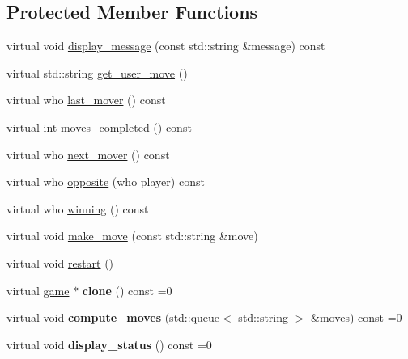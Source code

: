 \subsection*{Protected Member Functions}
\begin{DoxyCompactItemize}
\item 
virtual void \hyperlink{classmain__savitch__14_1_1game_ab8b87c3a1b68634861a8c0ed2b9f1992}{display\+\_\+message} (const std\+::string \&message) const 
\item 
virtual std\+::string \hyperlink{classmain__savitch__14_1_1game_af389f976b7a6c75e096990a09fac94ba}{get\+\_\+user\+\_\+move} ()
\item 
virtual who \hyperlink{classmain__savitch__14_1_1game_a38d435da6aadc192ac10160b26ea0cc1}{last\+\_\+mover} () const 
\item 
virtual int \hyperlink{classmain__savitch__14_1_1game_aee677d1ef52c35474cb7c6071bb71749}{moves\+\_\+completed} () const 
\item 
virtual who \hyperlink{classmain__savitch__14_1_1game_a0d445fdec3201c91c145ee2763e08922}{next\+\_\+mover} () const 
\item 
virtual who \hyperlink{classmain__savitch__14_1_1game_ae38d001e92ebe46e1a1433e41446c7ab}{opposite} (who player) const 
\item 
virtual who \hyperlink{classmain__savitch__14_1_1game_a081611c42aa66b4d91bbefeec47c7c4e}{winning} () const 
\item 
virtual void \hyperlink{classmain__savitch__14_1_1game_a20597d0caa907aea47b27fed8be3759b}{make\+\_\+move} (const std\+::string \&move)
\item 
virtual void \hyperlink{classmain__savitch__14_1_1game_ad521a7d78e7c163a0bc28b709f0d45fd}{restart} ()
\item 
virtual \hyperlink{classmain__savitch__14_1_1game}{game} $\ast$ {\bfseries clone} () const =0\hypertarget{classmain__savitch__14_1_1game_a7b663057f59210dd52738facfc40d959}{}\label{classmain__savitch__14_1_1game_a7b663057f59210dd52738facfc40d959}

\item 
virtual void {\bfseries compute\+\_\+moves} (std\+::queue$<$ std\+::string $>$ \&moves) const =0\hypertarget{classmain__savitch__14_1_1game_a2c0c049f5861026d0f639b5837889b7a}{}\label{classmain__savitch__14_1_1game_a2c0c049f5861026d0f639b5837889b7a}

\item 
virtual void {\bfseries display\+\_\+status} () const =0\hypertarget{classmain__savitch__14_1_1game_ac8205178922c49bab2865187e834b726}{}\label{classmain__savitch__14_1_1game_ac8205178922c49bab2865187e834b726}


\end{DoxyCompactItemize}
